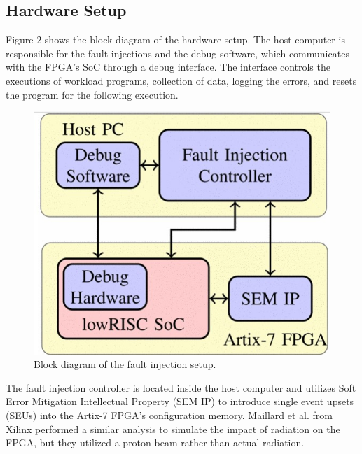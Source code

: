 \documentclass[conference]{IEEEtran}
\begin{document}
\subsection{Hardware Setup}
Figure 2 shows the block diagram of the hardware setup. 
The host computer is responsible for the fault injections and the debug software, which communicates with the FPGA's SoC
through a debug interface. The interface controls the executions of workload programs, collection of data, logging the errors,
and resets the program for the following execution.  
\begin{figure}[h]
    \centering
    \includegraphics[scale = 0.5]{fault_inject.jpg}
    \caption{Block diagram of the fault injection setup.}
\end{figure}
The fault injection controller is located inside the host computer and utilizes Soft Error Mitigation Intellectual Property (SEM IP)
to introduce single event upsets (SEUs) into the Artix-7 FPGA's configuration memory. Maillard et al. from Xilinx performed 
a similar analysis\cite{b3} to simulate the impact of radiation on the FPGA, but they utilized a proton beam rather than actual radiation.
\end{document}

